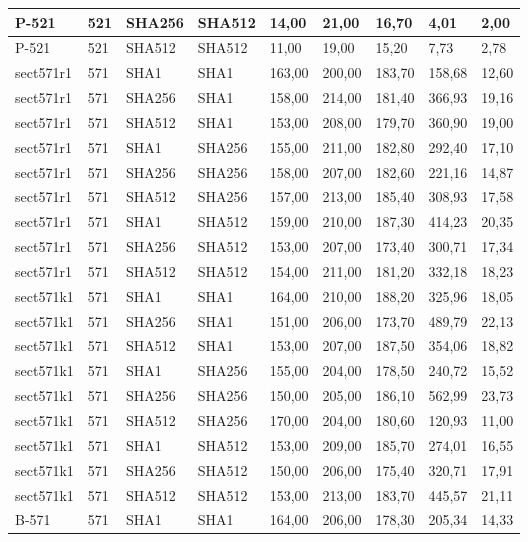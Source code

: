 \begin{longtable}{| l | l | l | l | l |l |l |l |l |}
P-521 & 521 & SHA256 & SHA512 & 14,00 & 21,00 & 16,70 & 4,01 & 2,00 \\ \hline 
P-521 & 521 & SHA512 & SHA512 & 11,00 & 19,00 & 15,20 & 7,73 & 2,78 \\ \hline 
sect571r1 & 571 & SHA1 & SHA1 & 163,00 & 200,00 & 183,70 & 158,68 & 12,60 \\ \hline 
sect571r1 & 571 & SHA256 & SHA1 & 158,00 & 214,00 & 181,40 & 366,93 & 19,16 \\ \hline 
sect571r1 & 571 & SHA512 & SHA1 & 153,00 & 208,00 & 179,70 & 360,90 & 19,00 \\ \hline 
sect571r1 & 571 & SHA1 & SHA256 & 155,00 & 211,00 & 182,80 & 292,40 & 17,10 \\ \hline 
sect571r1 & 571 & SHA256 & SHA256 & 158,00 & 207,00 & 182,60 & 221,16 & 14,87 \\ \hline 
sect571r1 & 571 & SHA512 & SHA256 & 157,00 & 213,00 & 185,40 & 308,93 & 17,58 \\ \hline 
sect571r1 & 571 & SHA1 & SHA512 & 159,00 & 210,00 & 187,30 & 414,23 & 20,35 \\ \hline 
sect571r1 & 571 & SHA256 & SHA512 & 153,00 & 207,00 & 173,40 & 300,71 & 17,34 \\ \hline 
sect571r1 & 571 & SHA512 & SHA512 & 154,00 & 211,00 & 181,20 & 332,18 & 18,23 \\ \hline 
sect571k1 & 571 & SHA1 & SHA1 & 164,00 & 210,00 & 188,20 & 325,96 & 18,05 \\ \hline 
sect571k1 & 571 & SHA256 & SHA1 & 151,00 & 206,00 & 173,70 & 489,79 & 22,13 \\ \hline 
sect571k1 & 571 & SHA512 & SHA1 & 153,00 & 207,00 & 187,50 & 354,06 & 18,82 \\ \hline 
sect571k1 & 571 & SHA1 & SHA256 & 155,00 & 204,00 & 178,50 & 240,72 & 15,52 \\ \hline 
sect571k1 & 571 & SHA256 & SHA256 & 150,00 & 205,00 & 186,10 & 562,99 & 23,73 \\ \hline 
sect571k1 & 571 & SHA512 & SHA256 & 170,00 & 204,00 & 180,60 & 120,93 & 11,00 \\ \hline 
sect571k1 & 571 & SHA1 & SHA512 & 153,00 & 209,00 & 185,70 & 274,01 & 16,55 \\ \hline 
sect571k1 & 571 & SHA256 & SHA512 & 150,00 & 206,00 & 175,40 & 320,71 & 17,91 \\ \hline 
sect571k1 & 571 & SHA512 & SHA512 & 153,00 & 213,00 & 183,70 & 445,57 & 21,11 \\ \hline 
B-571 & 571 & SHA1 & SHA1 & 164,00 & 206,00 & 178,30 & 205,34 & 14,33 \\ \hline 

\end{longtable}
